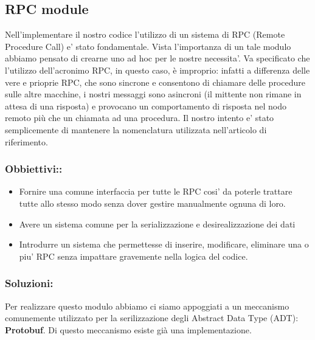 \subsection{RPC module}
Nell'implementare il nostro codice l'utilizzo di un sistema di RPC (Remote Procedure Call) e' stato
fondamentale. Vista l'importanza di un tale modulo abbiamo pensato di crearne uno ad hoc per le 
nostre necessita'. Va specificato che l'utilizzo dell'acronimo RPC, in questo caso, è improprio: 
infatti a differenza delle vere e prioprie RPC, che sono sincrone e consentono di chiamare 
delle procedure sulle altre macchine, i nostri messaggi sono asincroni (il mittente non rimane 
in attesa di una risposta) e provocano un comportamento di risposta nel nodo remoto più che un 
chiamata ad una procedura. Il nostro intento e' stato semplicemente di mantenere la nomenclatura
utilizzata nell'articolo di riferimento.
\subsubsection{Obbiettivi::\\}
\begin{itemize}
    \item Fornire una comune interfaccia per tutte le RPC cosi' da poterle trattare tutte 
        allo stesso modo senza dover gestire manualmente ognuna di loro.
    \item Avere un sistema comune per la serializzazione e desirealizzazione dei dati
    \item Introdurre un sistema che permettesse di inserire, modificare, eliminare una o piu' RPC
        senza impattare gravemente nella logica del codice.
\end{itemize}
\subsubsection{Soluzioni:\\}
Per realizzare questo modulo abbiamo ci siamo appoggiati a un meccanismo comunemente utilizzato 
per la serilizzazione degli Abstract Data Type (ADT): \textbf{Protobuf}.
Di questo meccanismo esiste già una implementazione.

